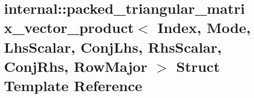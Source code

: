 \hypertarget{structinternal_1_1packed__triangular__matrix__vector__product_3_01_index_00_01_mode_00_01_lhs_sc27c8536a613da6e5ab28fe48015c06ef}{}\section{internal\+:\+:packed\+\_\+triangular\+\_\+matrix\+\_\+vector\+\_\+product$<$ Index, Mode, Lhs\+Scalar, Conj\+Lhs, Rhs\+Scalar, Conj\+Rhs, Row\+Major $>$ Struct Template Reference}
\label{structinternal_1_1packed__triangular__matrix__vector__product_3_01_index_00_01_mode_00_01_lhs_sc27c8536a613da6e5ab28fe48015c06ef}
